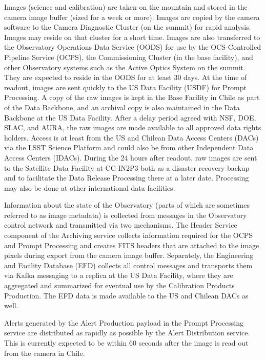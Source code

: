 \documentclass[DM,toc,lsstdraft]{lsstdoc}
\begin{document}
Images (science and calibration) are taken on the mountain and stored in the camera image buffer (sized for a week or more).
Images are copied by the camera software to the Camera Diagnostic Cluster (on the summit) for rapid analysis.
Images may reside on that cluster for a short time.
Images are also transferred to the Observatory Operations Data Service (OODS) for use by the OCS-Controlled Pipeline Service (OCPS), the Commissioning Cluster (in the base facility), and other Observatory systems such as the Active Optics System on the summit.
They are expected to reside in the OODS for at least 30 days.
At the time of readout, images are sent quickly to the US Data Facility (USDF) for Prompt Processing.
A copy of the raw images is kept in the Base Facility in Chile as part of the Data Backbone, and an archival copy is also maintained in the Data Backbone at the US Data Facility.
After a delay period agreed with NSF, DOE, SLAC, and AURA, the raw images are made available to all approved data rights holders.
Access is at least from the US and Chilean Data Access Centers (DACs) via the LSST Science Platform and could also be from other Independent Data Access Centers (IDACs).
During the 24 hours after readout, raw images are sent to the Satellite Data Facility at CC-IN2P3 both as a disaster recovery backup and to facilitate the Data Release Processing there at a later date.
Processing may also be done at other international data facilities.

Information about the state of the Observatory (parts of which are sometimes referred to as image metadata) is collected from messages in the Observatory control network and transmitted via two mechanisms.
The Header Service component of the Archiving service collects information required for the OCPS and Prompt Processing and creates FITS headers that are attached to the image pixels during export from the camera image buffer.
Separately, the Engineering and Facility Database (EFD) collects all control messages and transports them via Kafka messaging to a replica at the US Data Facility, where they are aggregated and summarized for eventual use by the Calibration Products Production.
The EFD data is made available to the US and Chilean DACs as well.

Alerts generated by the Alert Production payload in the Prompt Processing service are distributed as rapidly as possible by the Alert Distribution service.
This is currently expected to be within 60 seconds after the image is read out from the camera in Chile.
\end{document}

